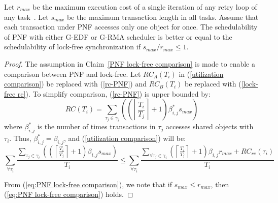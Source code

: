 \begin{clm}\label{PNF lock-free comparison}
Let $r_{max}$ be the maximum execution cost of a single iteration of any retry loop of any task~\cite{key-5}. Let $s_{max}$ be the maximum transaction length in all tasks. Assume that each transaction under PNF accesses only one object for once. The schedulability of PNF with either G-EDF or G-RMA scheduler is better or equal to the schedulability of lock-free
synchronization if $s_{max}/r_{max}\le 1$.
\end{clm}
\begin{proof}\normalfont
The assumption in Claim~\ref{PNF lock-free comparison} is made to enable a comparison between PNF and lock-free. Let $RC_{A}(T_{i})$ in (\ref{utilization comparison}) be replaced
with (\ref{rc-PNF}) and $RC_{B}(T_{i})$ be replaced with (\ref{lock-free rc}).
To simplify comparison, (\ref{rc-PNF}) is upper bounded by:
%
\begin{equation*}
RC(T_{i})=\sum_{\tau_{j}\in\gamma_{i}}\left(\left(\left\lceil \frac{T_{i}}{T_{j}}\right\rceil +1\right)\beta_{i,j}^* s_{max}\right)
\end{equation*}
%
where $\beta_{i,j}^*$ is the number of times transactions in $\tau_j$ accesses shared objects with $
\tau_i$. Thus, $\beta_{i,j}^* = \beta_{i,j}$, and (\ref{utilization comparison}) will be:
\begin{equation}
\sum_{\forall\tau_{i}}\frac{\sum_{\tau_{j}\in\gamma_{i}}\left(\left(\left\lceil \frac{T_{i}}{T_{j}}\right\rceil +1\right)\beta_{i,j}s_{max}\right)}{T_{i}}\le \sum_{\forall\tau_{i}}\frac{\sum_{\forall\tau_{j}\in\gamma_{i}}\left(\left\lceil \frac{T_{i}}{T_{j}}\right\rceil +1\right)\beta_{i,j}r_{max}+RC_{re}(\tau_i)}{T_{i}}\label{eq:PNF lock-free comparison}
\end{equation}

From (\ref{eq:PNF lock-free comparison}), we note that if $s_{max}\le r_{max}$,
then (\ref{eq:PNF lock-free comparison}) holds. 
\end{proof}


